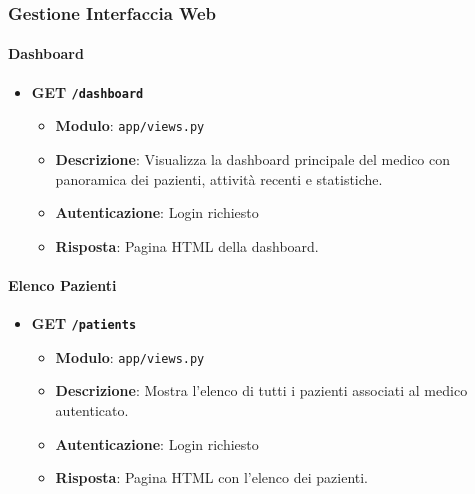 \documentclass[12pt,a4paper,oneside]{report}
\begin{document}
\subsubsection{Gestione Interfaccia Web}

\paragraph{Dashboard}
\begin{itemize}
    \item \textbf{GET \texttt{/dashboard}}
          \begin{itemize}
              \item \textbf{Modulo}: \texttt{app/views.py}
              \item \textbf{Descrizione}: Visualizza la dashboard principale del medico con panoramica dei pazienti, attività recenti e statistiche.
              \item \textbf{Autenticazione}: Login richiesto
              \item \textbf{Risposta}: Pagina HTML della dashboard.
          \end{itemize}
\end{itemize}

\paragraph{Elenco Pazienti}
\begin{itemize}
    \item \textbf{GET \texttt{/patients}}
          \begin{itemize}
              \item \textbf{Modulo}: \texttt{app/views.py}
              \item \textbf{Descrizione}: Mostra l'elenco di tutti i pazienti associati al medico autenticato.
              \item \textbf{Autenticazione}: Login richiesto
              \item \textbf{Risposta}: Pagina HTML con l'elenco dei pazienti.
          \end{itemize}
\end{itemize}
\end{document}
